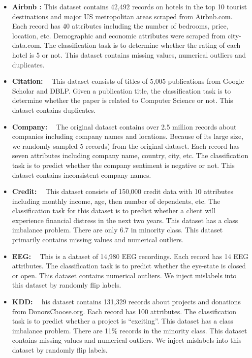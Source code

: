 \begin{itemize}
	\item {
	\textbf{Airbnb :} This dataset contains 42,492 records on hotels in the top
	10 tourist destinations and major US metropolitan areas scraped
	from Airbnb.com. Each record has 40 attributes including the number of bedrooms, price, location, etc. Demographic and economic attributes were scraped from city-data.com. The classification task is to determine whether the rating of each hotel is 5 or not. This
	dataset contains missing values, numerical outliers and duplicates.	
}

\item {
	\textbf{Citation: ~\cite{magellandata}} This dataset consists of titles of 5,005 publications from Google Scholar and DBLP. Given a publication title, the classification task is to determine whether the paper is related to Computer Science or not. This dataset contains duplicates.	
}

\item {
	\textbf{Company: ~\cite{Hatton2019}} The original dataset contains over 2.5 million records
	about companies including company names and locations. Because of its large size, we randomly sampled 5%
	records) from the original dataset. Each record has seven attributes including company name, country, city, etc. The classification task
	is to predict whether the company sentiment is negative or not. This dataset contains inconsistent company names.
}

\item {
	\textbf{Credit: ~\cite{creditdataset2019}}
	This dataset consists of 150,000 credit data with 10
	attributes including monthly income, age, then number of dependents, etc. The classification task for this dataset is to predict whether
	a client will experience financial distress in the next two years. This
	dataset has a class imbalance problem. There are only 6.7%
	in minority class. This dataset primarily contains missing values
	and numerical outliers.
}

\item {
	\textbf{EEG: ~\cite{Dua:2019}}
	This is a dataset of 14,980 EEG recordings. Each record
	has 14 EEG attributes. The classification task is to predict whether
	the eye-state is closed or open. This dataset contains numerical outliers. We inject mislabels into this dataset by randomly flip labels.
}

\item {
	\textbf{KDD: ~\cite{KDDdataset2019}}
	his dataset contains 131,329 records about projects and
	donations from DonorsChoose.org. Each record has 100 attributes. The classification task is to predict whether a project is “exciting”.
	This dataset has a class imbalance problem. There are 11\% records
	in the minority class. This dataset contains missing values and numerical outliers. We inject mislabels into this dataset by randomly
	flip labels.
}


\end{itemize}
